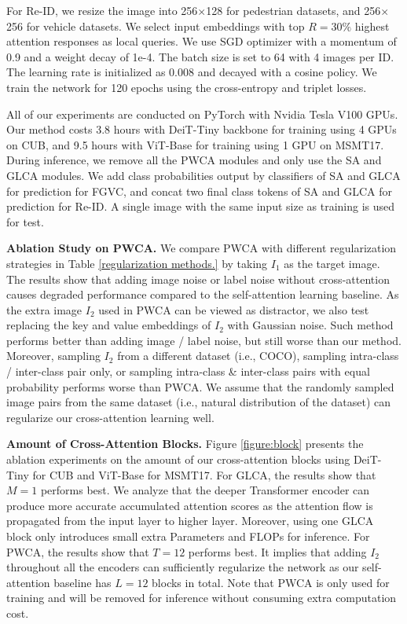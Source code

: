 For Re-ID, we resize the image into 256$\times$128 for pedestrian datasets, and 256$\times$256 for vehicle datasets. We select input embeddings with top $R=30\%$ highest attention responses as local queries. We use SGD optimizer with a momentum of 0.9 and a weight decay of 1e-4. The batch size is set to 64 with 4 images per ID. The learning rate is initialized as 0.008 and decayed with a cosine policy. We train the network for 120 epochs using the cross-entropy and triplet losses.

All of our experiments are conducted on PyTorch with Nvidia Tesla V100 GPUs. Our method costs 3.8 hours with DeiT-Tiny backbone for training using 4 GPUs on CUB, and 9.5 hours with ViT-Base for training using 1 GPU on MSMT17. During inference, we remove all the PWCA modules and only use the SA and GLCA modules. We add class probabilities output by classifiers of SA and GLCA for prediction for FGVC, and concat two final class tokens of SA and GLCA for prediction for Re-ID. A single image with the same input size as training is used for test. 


\textbf{Ablation Study on PWCA.} 
We compare PWCA with different regularization strategies in Table \ref{regularization methods.} by taking $I_1$ as the target image. The results show that adding image noise or label noise without cross-attention causes degraded performance compared to the self-attention learning baseline. As the extra image $I_2$ used in PWCA can be viewed as distractor, we also test replacing the key and value embeddings of $I_2$ with Gaussian noise. Such method performs better than adding image / label noise, but still worse than our method. Moreover, sampling $I_2$ from a different dataset (i.e., COCO), sampling intra-class / inter-class pair only, or sampling intra-class \& inter-class pairs with equal probability performs worse than PWCA. We assume that the randomly sampled image pairs from the same dataset (i.e., natural distribution of the dataset) can regularize our cross-attention learning well.


\textbf{Amount of Cross-Attention Blocks.} Figure \ref{figure:block} presents the ablation experiments on the amount of our cross-attention blocks using DeiT-Tiny for CUB and ViT-Base for MSMT17. For GLCA, the results show that $M=1$ performs best. We analyze that the deeper Transformer encoder can produce more accurate accumulated attention scores as the attention flow is propagated from the input layer to higher layer. Moreover, using one GLCA block only introduces small extra Parameters and FLOPs for inference. For PWCA, the results show that $T=12$ performs best. It implies that adding $I_2$ throughout all the encoders can sufficiently regularize the network as our self-attention baseline has $L=12$ blocks in total. Note that PWCA is only used for training and will be removed for inference without consuming extra computation cost.



